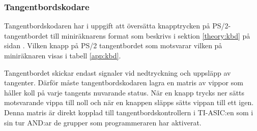 \documentclass[main.tex]{subfiles}
\begin{document}
\subsubsection{Tangentbordskodare}
Tangentbordskodaren har i uppgift att översätta knapptrycken på
PS/2-tangentbordet till miniräknarens format som beskrivs i sektion
\ref{theory:kbd} på sidan \pageref{theory:kbd}. Vilken knapp på PS/2
tangentbordet som motsvarar vilken på miniräknaren visas i tabell
\ref{app:kbd}.

Tangentbordet skickar endast signaler vid nedtryckning och uppsläpp av
tangenter. Därför måste tangentbordskodaren lagra en matris av vippor som
håller koll på varje tangents nuvarande status. När en knapp trycks ner sätts
motsvarande vippa till noll och när en knappen släpps sätts vippan till ett
igen. Denna matris är direkt kopplad till tangentbordskontrollern i TI-ASIC:en
som i sin tur AND:ar de grupper som programmeraren har aktiverat.
\end{document}
